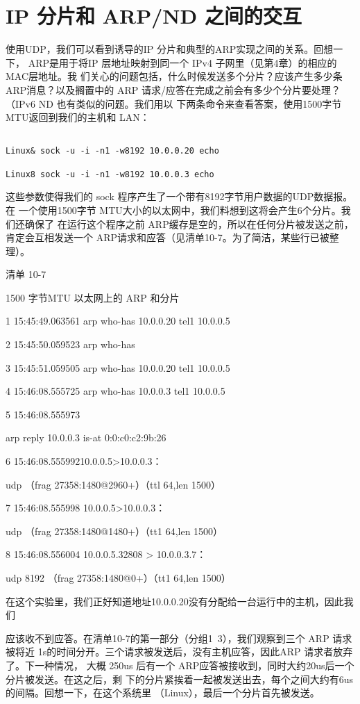 \section{IP 分片和 ARP/ND 之间的交互}

使用UDP，我们可以看到诱导的IP 分片和典型的ARP实现之间的关系。回想一下，
ARP是用于将IP 层地址映射到同一个 IPv4 子网里（见第4章）的相应的MAC层地址。我
们关心的问题包括，什么时候发送多个分片？应该产生多少条ARP消息？以及搁置中的
ARP 请求/应答在完成之前会有多少个分片要处理？（IPv6 ND 也有类似的问题。我们用以
下两条命令来查看答案，使用1500字节 MTU返回到我们的主机和 LAN：

\begin{verbatim}
    
Linux& sock -u -i -n1 -w8192 10.0.0.20 echo

Linux8 sock -u -i -n1 -w8192 10.0.0.3 echo
\end{verbatim}

这些参数使得我们的 sock 程序产生了一个带有8192字节用户数据的UDP数据报。在
一个使用1500字节 MTU大小的以太网中，我们料想到这将会产生6个分片。我们还确保了
在运行这个程序之前 ARP缓存是空的，所以在任何分片被发送之前，肯定会互相发送一个
ARP请求和应答（见清单10-7。为了简洁，某些行已被整理）。

清单 10-7

1500 字节MTU 以太网上的 ARP 和分片

1 15:45:49.063561 arp who-has 10.0.0.20 tel1 10.0.0.5

2 15:45:50.059523 arp who-has

3 15:45:51.059505 arp who-has 10.0.0.20 tel1 10.0.0.5

4 15:46:08.555725 arp who-has 10.0.0.3 tel1 10.0.0.5

5 15:46:08.555973

arp reply 10.0.0.3 is-at 0:0:c0:c2:9b:26

6 15:46:08.55599210.0.0.5>10.0.0.3：

udp （frag 27358:1480@2960+）（ttl 64,len 1500）

7 15:46:08.555998 10.0.0.5>10.0.0.3：

udp （frag 27358:1480@1480+）（tt1 64,len 1500）

8 15:46:08.556004 10.0.0.5.32808 > 10.0.0.3.7：

udp 8192 （frag 27358:1480@0+）（tt1 64,len 1500）

在这个实验里，我们正好知道地址10.0.0.20没有分配给一台运行中的主机，因此我们

应该收不到应答。在清单10-7的第一部分（分组1~3），我们观察到三个 ARP 请求被将近
1s的时间分开。三个请求被发送后，没有主机应答，因此ARP 请求者放弃了。下一种情况，
大概 250us 后有一个 ARP应答被接收到，同时大约20us后一个分片被发送。在这之后，剩
下的分片紧挨着一起被发送出去，每个之间大约有6us 的间隔。回想一下，在这个系统里
（Linux），最后一个分片首先被发送。

